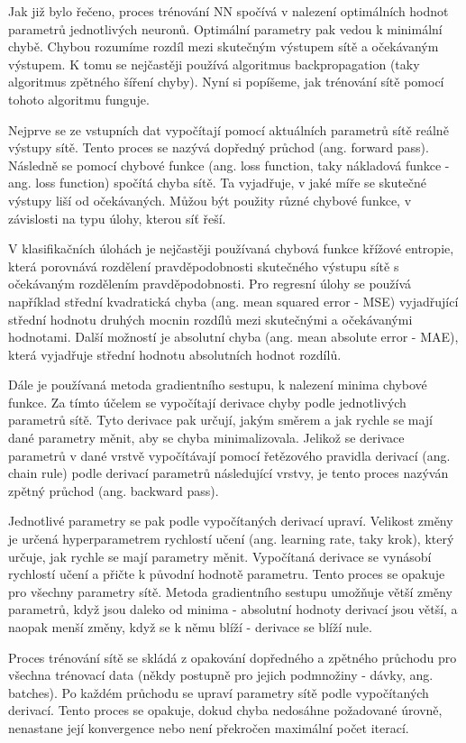 Jak již bylo řečeno, proces trénování NN spočívá v nalezení optimálních hodnot
parametrů jednotlivých neuronů. Optimální parametry pak vedou k minimální
chybě. Chybou rozumíme rozdíl mezi skutečným výstupem sítě a očekávaným
výstupem. K tomu se nejčastěji používá algoritmus backpropagation (taky
algoritmus zpětného šíření chyby). Nyní si popíšeme, jak trénování sítě pomocí
tohoto algoritmu funguje.

Nejprve se ze vstupních dat vypočítají pomocí aktuálních parametrů sítě reálně
výstupy sítě. Tento proces se nazývá dopředný průchod (ang. forward pass).
Následně se pomocí chybové funkce (ang. loss function, taky nákladová funkce -
ang. loss function) spočítá chyba sítě. Ta vyjadřuje, v jaké míře se skutečné
výstupy liší od očekávaných. Můžou být použity různé chybové funkce, v
závislosti na typu úlohy, kterou síť řeší.

V klasifikačních úlohách je nejčastěji používaná chybová funkce křížové
entropie, která porovnává rozdělení pravděpodobnosti skutečného výstupu sítě s
očekávaným rozdělením pravděpodobnosti. Pro regresní úlohy se používá například
střední kvadratická chyba (ang. mean squared error - MSE) vyjadřující střední
hodnotu druhých mocnin rozdílů mezi skutečnými a očekávanými hodnotami. Další
možností je absolutní chyba (ang. mean absolute error - MAE), která vyjadřuje
střední hodnotu absolutních hodnot rozdílů.

Dále je používaná metoda gradientního sestupu, k nalezení minima chybové
funkce. Za tímto účelem se vypočítají derivace chyby podle jednotlivých
parametrů sítě. Tyto derivace pak určují, jakým směrem a jak rychle se mají
dané parametry měnit, aby se chyba minimalizovala. Jelikož se derivace
parametrů v dané vrstvě vypočítávají pomocí řetězového pravidla derivací (ang.
chain rule) podle derivací parametrů následující vrstvy, je tento proces
nazýván zpětný průchod (ang. backward pass).

Jednotlivé parametry se pak podle vypočítaných derivací upraví. Velikost změny
je určená hyperparametrem rychlostí učení (ang. learning rate, taky krok),
který určuje, jak rychle se mají parametry měnit. Vypočítaná derivace se
vynásobí rychlostí učení a přičte k původní hodnotě parametru. Tento proces se
opakuje pro všechny parametry sítě. Metoda gradientního sestupu umožňuje větší
změny parametrů, když jsou daleko od minima - absolutní hodnoty derivací jsou
větší, a naopak menší změny, když se k němu blíží - derivace se blíží nule.

Proces trénování sítě se skládá z opakování dopředného a zpětného průchodu pro
všechna trénovací data (někdy postupně pro jejich podmnožiny - dávky, ang.
batches). Po každém průchodu se upraví parametry sítě podle vypočítaných
derivací. Tento proces se opakuje, dokud chyba nedosáhne požadované úrovně,
nenastane její konvergence nebo není překročen maximální počet iterací.


